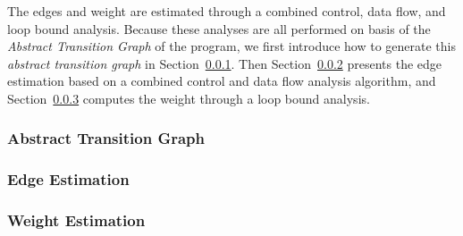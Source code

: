 The edges and weight are estimated through a combined control, data flow, and loop bound analysis.
Because these analyses are all performed on basis of the \emph{Abstract Transition Graph} of the program, we first introduce how to generate this \emph{abstract transition graph} in Section~\ref{sec:alg_abscfg}.
Then Section~\ref{sec:alg_edgegen} presents the edge estimation based on a combined control and data flow analysis algorithm,
and Section~\ref{sec:alg_weightgen}
computes the weight through a loop bound analysis.

\subsubsection{Abstract Transition Graph}
\label{sec:alg_abscfg}

%
\subsubsection{Edge Estimation}
\label{sec:alg_edgegen}

%

\subsubsection{Weight Estimation}
\label{sec:alg_weightgen}
